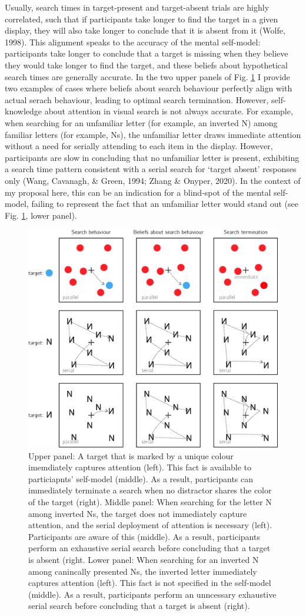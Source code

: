 \documentclass[12pt,twoside]{reedthesis}
\begin{document}
Usually, search times in target-present and target-absent trials are highly correlated, such that if participants take longer to find the target in a given display, they will also take longer to conclude that it is absent from it (Wolfe, 1998). This alignment speaks to the accuracy of the mental self-model: participants take longer to conclude that a target is missing when they believe they would take longer to find the target, and these beliefs about hypothetical search times are generally accurate. In the two upper panels of Fig. \ref{fig:intro-search} I provide two examples of cases where beliefs about search behaviour perfectly align with actual serach behaviour, leading to optimal search termination. However, self-knowledge about attention in visual search is not always accurate. For example, when searching for an unfamiliar letter (for example, an inverted N) among familiar letters (for example, Ns), the unfamiliar letter draws immediate attention without a need for serially attending to each item in the display. However, participants are slow in concluding that no unfamiliar letter is present, exhibiting a search time pattern consistent with a serial search for `target absent' responses only (Wang, Cavanagh, \& Green, 1994; Zhang \& Onyper, 2020). In the context of my proposal here, this can be an indication for a blind-spot of the mental self-model, failing to represent the fact that an unfamiliar letter would stand out (see Fig. \ref{fig:intro-search}, lower panel).
\begin{figure}
\includegraphics[width=0.7\linewidth]{figure/intro/search} \caption{Upper panel: A target that is marked by a unique colour imemdiately captures attention (left). This fact is available to particiapnts' self-model (middle). As a result, participants can immediately terminate a search when no distractor shares the color of the target (right). Middle panel: When searching for the letter N among inverted Ns, the target does not immediately capture attention, and the serial deployment of attention is necessary (left). Participants are aware of this (middle). As a result, participants perform an exhaustive serial search before concluding that a target is absent (right. Lower panel: When searching for an inverted N among canincally presented Ns, the inverted letter immediately captures attention (left). This fact is not specified in the self-model (middle). As a result, participants perform an unncessary exhaustive serial search before concluding that a target is absent (right).}\label{fig:intro-search}
\end{figure}
\end{document}
